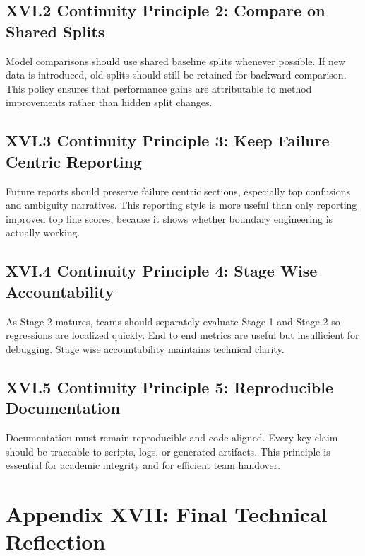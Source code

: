 \subsection*{XVI.2 Continuity Principle 2: Compare on Shared Splits}
Model comparisons should use shared baseline splits whenever possible. If new data is introduced, old splits should still be retained for backward comparison. This policy ensures that performance gains are attributable to method improvements rather than hidden split changes.

\subsection*{XVI.3 Continuity Principle 3: Keep Failure Centric Reporting}
Future reports should preserve failure centric sections, especially top confusions and ambiguity narratives. This reporting style is more useful than only reporting improved top line scores, because it shows whether boundary engineering is actually working.

\subsection*{XVI.4 Continuity Principle 4: Stage Wise Accountability}
As Stage 2 matures, teams should separately evaluate Stage 1 and Stage 2 so regressions are localized quickly. End to end metrics are useful but insufficient for debugging. Stage wise accountability maintains technical clarity.

\subsection*{XVI.5 Continuity Principle 5: Reproducible Documentation}
Documentation must remain reproducible and code-aligned. Every key claim should be traceable to scripts, logs, or generated artifacts. This principle is essential for academic integrity and for efficient team handover.

\section*{Appendix XVII: Final Technical Reflection}

